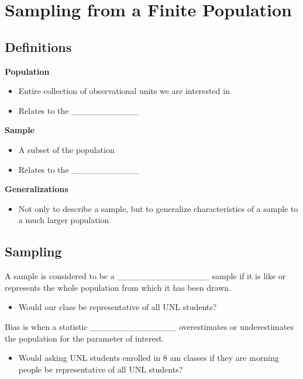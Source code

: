 \documentclass[
  letterpaper,
  DIV=11,
  numbers=noendperiod]{scrartcl}
\author{}
\date{}
\providecommand{\tightlist}{%
  \setlength{\itemsep}{0pt}\setlength{\parskip}{0pt}}
\begin{document}
\section{Sampling from a Finite
Population}\label{sampling-from-a-finite-population}

\subsection{Definitions}\label{definitions}

\textbf{Population}

\begin{itemize}
\item
  Entire collection of observational units we are interested in
\item
  Relates to the \_\_\_\_\_\_\_\_\_\_\_
\end{itemize}

\textbf{Sample}

\begin{itemize}
\item
  A subset of the population
\item
  Relates to the \_\_\_\_\_\_\_\_\_\_\_
\end{itemize}

\textbf{Generalizations}

\begin{itemize}
\tightlist
\item
  Not only to describe a sample, but to generalize characteristics of a
  sample to a much larger population
\end{itemize}

\subsection{Sampling}\label{sampling}

A sample is considered to be a \_\_\_\_\_\_\_\_\_\_\_\_\_\_\_ sample if
it is like or represents the whole population from which it has been
drawn.

\begin{itemize}
\tightlist
\item
  Would our class be representative of all UNL students?
\end{itemize}

Bias is when a statistic \_\_\_\_\_\_\_\_\_\_\_\_\_\_ overestimates or
underestimates the population for the parameter of interest.

\begin{itemize}
\tightlist
\item
  Would asking UNL students enrolled in 8 am classes if they are morning
  people be representative of all UNL students?
\end{itemize}
\end{document}
